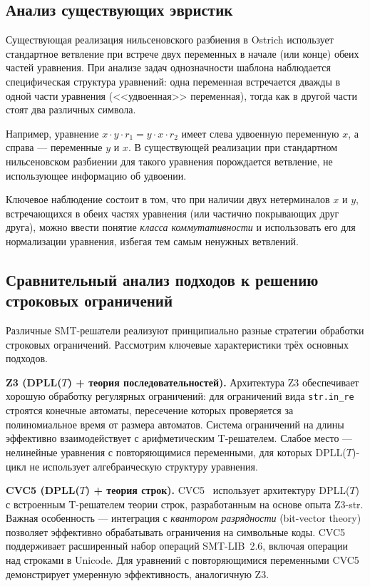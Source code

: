 \documentclass[14pt, russian]{scrartcl}
\begin{document}
\subsection{Анализ существующих эвристик}

Существующая реализация нильсеновского разбиения в Ostrich использует стандартное
ветвление при встрече двух переменных в начале (или конце) обеих частей уравнения.
При анализе задач однозначности шаблона наблюдается специфическая структура уравнений:
одна переменная встречается дважды в одной части уравнения (<<удвоенная>> переменная),
тогда как в другой части стоят два различных символа.

Например, уравнение $x \cdot y \cdot r_1 = y \cdot x \cdot r_2$ имеет слева
удвоенную переменную $x$, а справа --- переменные $y$ и $x$. В существующей реализации
при стандартном нильсеновском разбиении для такого уравнения порождается ветвление,
не использующее информацию об удвоении.

Ключевое наблюдение состоит в том, что при наличии двух нетерминалов $x$ и $y$,
встречающихся в обеих частях уравнения (или частично покрывающих друг друга), можно
ввести понятие \emph{класса коммутативности} и использовать его для нормализации уравнения,
избегая тем самым ненужных ветвлений.

\subsection{Сравнительный анализ подходов к решению строковых ограничений}

Различные SMT-решатели реализуют принципиально разные стратегии обработки
строковых ограничений. Рассмотрим ключевые характеристики трёх основных подходов.

\medskip\noindent\textbf{Z3 (DPLL($T$) + теория последовательностей).}
Архитектура Z3 обеспечивает хорошую обработку регулярных ограничений: для
ограничений вида \texttt{str.in\_re} строятся конечные автоматы, пересечение
которых проверяется за полиномиальное время от размера автоматов. Система
ограничений на длины эффективно взаимодействует с арифметическим T-решателем.
Слабое место --- нелинейные уравнения с повторяющимися переменными, для которых
DPLL($T$)-цикл не использует алгебраическую структуру уравнения.

\medskip\noindent\textbf{CVC5 (DPLL($T$) + теория строк).}
CVC5~\cite{barbosa2022} использует архитектуру DPLL($T$) с встроенным T-решателем
теории строк, разработанным на основе опыта Z3-str. Важная особенность ---
интеграция с \emph{квантором разрядности} (bit-vector theory) позволяет эффективно
обрабатывать ограничения на символьные коды. CVC5 поддерживает расширенный набор
операций SMT-LIB~2.6, включая операции над строками в Unicode. Для уравнений
с повторяющимися переменными CVC5 демонстрирует умеренную эффективность,
аналогичную Z3.
\end{document}
